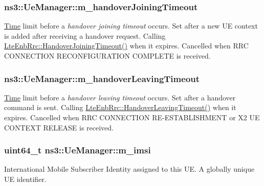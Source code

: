 \subsubsection[{\texorpdfstring{m\+\_\+handover\+Joining\+Timeout}{m_handoverJoiningTimeout}}]{ ns3\+::\+Ue\+Manager\+::m\+\_\+handover\+Joining\+Timeout\hspace{0.3cm}{\ttfamily [private]}}\hypertarget{classns3_1_1UeManager_a441fc4eda92a15be344d70b7039dacd4}{}\label{classns3_1_1UeManager_a441fc4eda92a15be344d70b7039dacd4}
\hyperlink{classns3_1_1Time}{Time} limit before a {\itshape handover joining timeout} occurs. Set after a new UE context is added after receiving a handover request. Calling \hyperlink{classns3_1_1LteEnbRrc_a8374075a52ca40290d3f15e253ef94ff}{Lte\+Enb\+Rrc\+::\+Handover\+Joining\+Timeout()} when it expires. Cancelled when R\+RC C\+O\+N\+N\+E\+C\+T\+I\+ON R\+E\+C\+O\+N\+F\+I\+G\+U\+R\+A\+T\+I\+ON C\+O\+M\+P\+L\+E\+TE is received. 
\subsubsection[{\texorpdfstring{m\+\_\+handover\+Leaving\+Timeout}{m_handoverLeavingTimeout}}]{ ns3\+::\+Ue\+Manager\+::m\+\_\+handover\+Leaving\+Timeout\hspace{0.3cm}{\ttfamily [private]}}\hypertarget{classns3_1_1UeManager_aebe46172b4387024c856c6917b5e2d6b}{}\label{classns3_1_1UeManager_aebe46172b4387024c856c6917b5e2d6b}
\hyperlink{classns3_1_1Time}{Time} limit before a {\itshape handover leaving timeout} occurs. Set after a handover command is sent. Calling \hyperlink{classns3_1_1LteEnbRrc_a3ded0535ab2c7f5b1346cf787745d06d}{Lte\+Enb\+Rrc\+::\+Handover\+Leaving\+Timeout()} when it expires. Cancelled when R\+RC C\+O\+N\+N\+E\+C\+T\+I\+ON R\+E-\/\+E\+S\+T\+A\+B\+L\+I\+S\+H\+M\+E\+NT or X2 UE C\+O\+N\+T\+E\+XT R\+E\+L\+E\+A\+SE is received. 
\subsubsection[{\texorpdfstring{m\+\_\+imsi}{m_imsi}}]{\setlength{\rightskip}{0pt plus 5cm}uint64\+\_\+t ns3\+::\+Ue\+Manager\+::m\+\_\+imsi\hspace{0.3cm}{\ttfamily [private]}}\hypertarget{classns3_1_1UeManager_a868dda076ecfc1d4202e357c16223d84}{}\label{classns3_1_1UeManager_a868dda076ecfc1d4202e357c16223d84}
International Mobile Subscriber Identity assigned to this UE. A globally unique UE identifier. 
